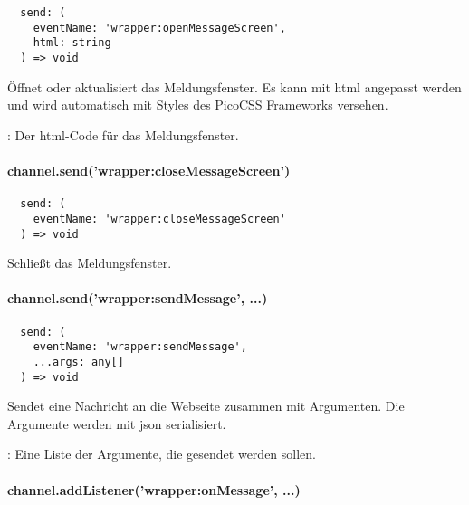 \begin{verbatim}
  send: (
    eventName: 'wrapper:openMessageScreen',
    html: string
  ) => void
\end{verbatim}

Öffnet oder aktualisiert das Meldungsfenster.
Es kann mit \ac{html} angepasst werden und wird automatisch mit Styles des PicoCSS Frameworks versehen.

\begin{arguments}
  \item {}: Der \ac{html}-Code für das Meldungsfenster.
\end{arguments}


\paragraph{channel.send('wrapper:closeMessageScreen')}

\begin{verbatim}
  send: (
    eventName: 'wrapper:closeMessageScreen'
  ) => void
\end{verbatim}

Schließt das Meldungsfenster.


\paragraph{channel.send('wrapper:sendMessage', ...)}

\begin{verbatim}
  send: (
    eventName: 'wrapper:sendMessage',
    ...args: any[]
  ) => void
\end{verbatim}

Sendet eine Nachricht an die Webseite zusammen mit Argumenten.
Die Argumente werden mit \ac{json} serialisiert.

\begin{arguments}
  \item {}: Eine Liste der Argumente, die gesendet werden sollen.
\end{arguments}


\paragraph{channel.addListener('wrapper:onMessage', ...)}

